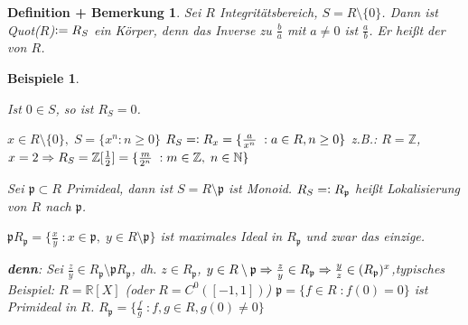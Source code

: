 \documentclass[a4paper,10pt,german]{scrbook}
\theoremstyle{saetze}
\theoremstyle{definitionen}
\newtheorem{DefBem}[Def]{Definition + Bemerkung}
\newtheorem{Bspe}[Def]{Beispiele}
\begin{document}
\begin{DefBem}
Sei $R$ Integritätsbereich, $S = R \setminus \{0\}$. Dann ist
Quot($R$)$\mathrel{\mathop:}= R_S$ ein Körper, denn das Inverse zu $\frac ba$ mit $a\ne 0$ ist $\frac ab$. Er heißt der  von $R$.

\end{DefBem}

\begin{Bspe}
\begin{enum}
\item Ist $0\in S$, so ist $R_S=0$.
\item $x \in R\setminus\{0\},\; S=\{x^n : n \geq 0\}$ $R_S =\mathrel{\mathop:}
R_x = \{ \frac{a}{x^n}\;:a\in R, n \geq 0\}$
\newline z.B.: $R = \mathbb{Z}$, $x=2 \Rightarrow R_S =
\mathbb{Z}[\frac{1}{2}] = \{ \frac{m}{2^n}\;: m \in \mathbb{Z},\;
n\in\mathbb{N}\}$
\item Sei $\mathfrak{p} \subset R$ Primideal, dann ist $S = R \setminus \mathfrak{p}$ ist Monoid.
\newline $R_S =\mathrel{\mathop:} R_\mathfrak{p}$ heißt Lokalisierung von $R$
nach $\mathfrak{p}$.

$\mathfrak{p}R_\mathfrak{p} = \{\frac{x}{y}\;:x\in
\mathfrak{p},\; y\in R \setminus \mathfrak{p}\}$ ist maximales Ideal
in $R_\mathfrak{p}$ und zwar das einzige.
\item \textbf{denn}: Sei $\frac{z}{y} \in R_\mathfrak{p}
\setminus \mathfrak{p}R_\mathfrak{p}$, dh. $z \in R_\mathfrak{p}$,
$y \in R \setminus \mathfrak{p} \Rightarrow \frac{z}{y} \in R_\mathfrak{p}
\Rightarrow \frac{y}{z} \in (R_\mathfrak{p})^x$,\newline typisches Beispiel:
$R = \mathbb{R}[X]$ (oder $R = C^0([-1,1])$) $\mathfrak{p} = \{f \in
R\;: f(0) = 0\}$ ist Primideal in $R$. $R_\mathfrak{p} =
\{\frac{f}{g}\;: f,g \in R, g(0) \neq 0\}$

\end{enum}
\end{Bspe}
\end{document}
